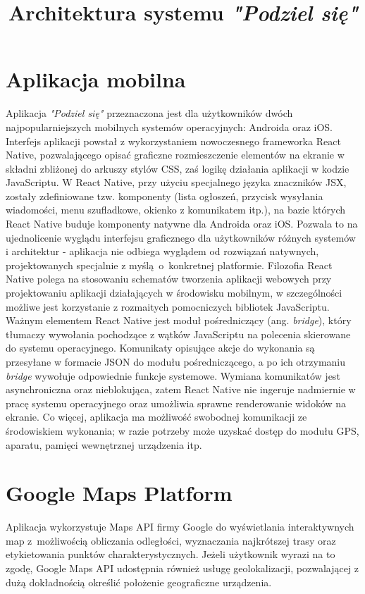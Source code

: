 \documentclass[12pt]{article}
\author{\vspace{-5ex}}
\date{\vspace{-11ex}}
\title{\textbf{Architektura systemu \textit{"Podziel się"}}}
\begin{document}
\maketitle

\section*{Aplikacja mobilna}
Aplikacja \textit{"Podziel się"} przeznaczona jest dla użytkowników dwóch najpopularniejszych mobilnych systemów operacyjnych: Androida oraz iOS. Interfejs aplikacji powstał z wykorzystaniem nowoczesnego frameworka React Native, pozwalającego opisać graficzne rozmieszczenie elementów na ekranie w składni zbliżonej do arkuszy stylów CSS, zaś logikę działania aplikacji w kodzie JavaScriptu. W React Native, przy użyciu specjalnego języka znaczników JSX, zostały zdefiniowane tzw. komponenty (lista ogłoszeń, przycisk wysyłania wiadomości, menu szufladkowe, okienko z komunikatem itp.), na bazie których React Native buduje komponenty natywne dla Androida oraz iOS. Pozwala to na ujednolicenie wyglądu interfejsu graficznego dla użytkowników różnych systemów i architektur - aplikacja nie odbiega wyglądem od rozwiązań natywnych, projektowanych specjalnie z myślą~o~konkretnej platformie. Filozofia React Native polega na stosowaniu schematów tworzenia aplikacji webowych przy projektowaniu aplikacji działających w środowisku mobilnym, w szczególności możliwe jest korzystanie z rozmaitych pomocniczych bibliotek JavaScriptu.
\vspace{4mm}\\Ważnym elementem React Native jest moduł pośredniczący (ang. \textit{bridge}), który tłumaczy wywołania pochodzące z wątków JavaScriptu na polecenia skierowane do systemu operacyjnego. Komunikaty opisujące akcje do wykonania są przesyłane w formacie JSON do modułu pośredniczącego, a po ich otrzymaniu \textit{bridge} wywołuje odpowiednie funkcje systemowe. Wymiana komunikatów jest asynchroniczna oraz nieblokująca, zatem React Native nie ingeruje nadmiernie w pracę systemu operacyjnego oraz umożliwia sprawne renderowanie widoków na ekranie. Co więcej, aplikacja ma możliwość swobodnej komunikacji ze środowiskiem wykonania; w razie potrzeby może uzyskać dostęp do modułu GPS, aparatu, pamięci wewnętrznej urządzenia itp.

\section*{Google Maps Platform}
Aplikacja wykorzystuje Maps API firmy Google do wyświetlania interaktywnych map z~możliwością obliczania odległości, wyznaczania najkrótszej trasy oraz etykietowania punktów charakterystycznych. Jeżeli użytkownik wyrazi na to zgodę, Google Maps API udostępnia również usługę geolokalizacji, pozwalającej z dużą dokładnością określić położenie geograficzne urządzenia.
\end{document}
